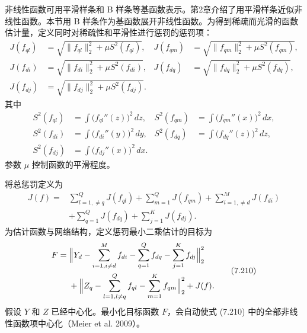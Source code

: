 非线性函数可用平滑样条和 B 样条等基函数表示。第2章介绍了用平滑样条近似非线性函数。本节用 B 样条作为基函数展开非线性函数。为得到稀疏而光滑的函数估计量，定义同时对稀疏性和平滑性进行惩罚的惩罚项：
\[
\begin{aligned}
J(f_{ql})&=\sqrt{\|f_{ql}\|_2^2+\mu S^2(f_{ql})},&
J(f_{qm})&=\sqrt{\|f_{qm}\|_2^2+\mu S^2(f_{qm})},\\
J(f_{di})&=\sqrt{\|f_{di}\|_2^2+\mu S^2(f_{di})},&
J(f_{dq})&=\sqrt{\|f_{dq}\|_2^2+\mu S^2(f_{dq})},\\
J(f_{dj})&=\sqrt{\|f_{dj}\|_2^2+\mu S^2(f_{dj})}.&&
\end{aligned}
\]
其中
\[
\begin{aligned}
S^2(f_{ql})&=\int\bigl(f_{ql}''(z)\bigr)^2\,dz,&
S^2(f_{qm})&=\int\bigl(f_{qm}''(x)\bigr)^2\,dx,\\
S^2(f_{di})&=\int\bigl(f_{di}''(y)\bigr)^2\,dy,&
S^2(f_{dq})&=\int\bigl(f_{dq}''(z)\bigr)^2\,dz,\\
S^2(f_{dj})&=\int\bigl(f_{dj}''(x)\bigr)^2\,dx.&&
\end{aligned}
\]
参数 $\mu$ 控制函数的平滑程度。

将总惩罚定义为
\begin{equation}
\begin{aligned}
J(f)={}&\sum_{l=1,\ne q}^{Q}J(f_{ql})+\sum_{m=1}^{Q}J(f_{qm})
+\sum_{i=1,\ne d}^{M}J(f_{di})\\
&+\sum_{q=1}^{Q}J(f_{dq})+\sum_{j=1}^{K}J(f_{dj}).
\end{aligned}
\tag{7.209}
\end{equation}
为估计函数与网络结构，定义惩罚最小二乘估计的目标为
\begin{equation}
\begin{aligned}
F={}&\Bigl\|Y_d-\sum_{i=1,i\ne d}^{M}f_{di}-\sum_{q=1}^{Q}f_{dq}-\sum_{j=1}^{K}f_{dj}\Bigr\|_2^2\\
&+\Bigl\|Z_q-\sum_{l=1,l\ne q}^{Q}f_{ql}-\sum_{m=1}^{K}f_{qm}\Bigr\|_2^2+J(f).
\end{aligned}
\tag{7.210}
\end{equation}
假设 $Y$ 和 $Z$ 已经中心化。最小化目标函数 $F$，会自动使式 (7.210) 中的全部非线性函数项中心化（Meier et al. 2009）。

